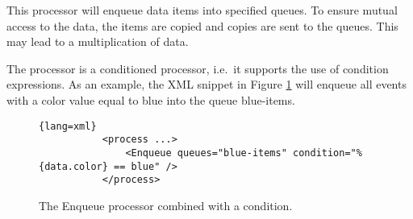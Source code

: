 
This processor will enqueue data items into specified queues. To
ensure mutual access to the data, the items are copied and copies are
sent to the queues. This may lead to a multiplication of data.

The processor is a conditioned processor, i.e.~it supports the use of
condition expressions. As an example, the XML snippet in Figure
\ref{fig:ex:Enqueue} will enqueue all events with a {\ttfamily color}
value equal to {\ttfamily blue} into the queue {\ttfamily blue-items}.

\begin{figure}[h!]
        \centering
        \begin{lstlisting}{lang=xml}
           <process ...>
               <Enqueue queues="blue-items" condition="%{data.color} == blue" />
           </process>
        \end{lstlisting}
        \caption{\label{fig:ex:Enqueue}The {\ttfamily Enqueue} processor combined with a condition.}
\end{figure}


\begin{table}[h]
\end{table}
